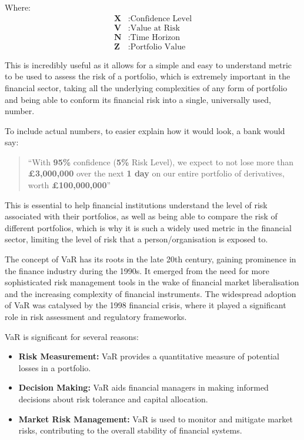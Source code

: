 \documentclass{article}
\begin{document}
Where:
\begin{align*}
  \textbf{X} & : \text{Confidence Level} \\
  \textbf{V} & : \text{Value at Risk} \\
  \textbf{N} & : \text{Time Horizon} \\
  \textbf{Z} & : \text{Portfolio Value}
\end{align*}

This is incredibly useful as it allows for a simple and easy to understand metric to be used to assess the risk of a portfolio, which is extremely important in the financial sector, taking all the underlying complexities of any form of portfolio and being able to conform its financial risk into a single, universally used, number. \\\vspace{0.3cm}

To include actual numbers, to easier explain how it would look, a bank would say:
\begin{quote}
  ``With \textbf{95\%} confidence (\textbf{5\%} Risk Level), we expect to not lose more than \textbf{£3,000,000} over the next \textbf{1 day} on our entire portfolio of derivatives, worth \textbf{£100,000,000}''
\end{quote}

This is essential to help financial institutions understand the level of risk associated with their portfolios, as well as being able to compare the risk of different portfolios, which is why it is such a widely used metric in the financial sector, limiting the level of risk that a person/organisation is exposed to.\\\vspace{0.3cm}

The concept of VaR has its roots in the late 20th century, gaining prominence in the finance industry during the 1990s. It emerged from the need for more sophisticated risk management tools in the wake of financial market liberalisation and the increasing complexity of financial instruments. The widespread adoption of VaR was catalysed by the 1998 financial crisis, where it played a significant role in risk assessment and regulatory frameworks.\\\vspace{0.3cm}


VaR is significant for several reasons:
\begin{itemize}
    \item \textbf{Risk Measurement:} VaR provides a quantitative measure of potential losses in a portfolio.
    \item \textbf{Decision Making:} VaR aids financial managers in making informed decisions about risk tolerance and capital allocation.
    \item \textbf{Market Risk Management:} VaR is used to monitor and mitigate market risks, contributing to the overall stability of financial systems.
\end{itemize}
\end{document}
